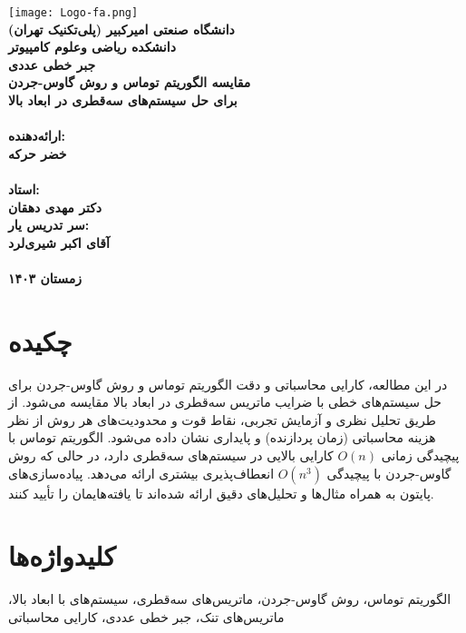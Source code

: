 \documentclass[a4paper,12pt]{article}
\begin{document}
\begin{titlepage}
    \centering
    \texttt{[image: Logo-fa.png]} \\[1cm]
    \textbf{\Large{دانشگاه صنعتی امیرکبیر (پلی‌تکنیک تهران)}} \\[0.5cm]
    \textbf{\Large{دانشکده ریاضی وعلوم کامپیوتر}} \\[0.5cm]
    \textbf{\Large{جبر خطی عددی}} \\[0.5cm]
    \textbf{\huge{مقایسه الگوریتم توماس و روش گاوس-جردن}} \\[0.5cm]
    \textbf{\huge{برای حل سیستم‌های سه‌قطری در ابعاد بالا}} \\[0.5cm]
    \textbf{\Large{}} \\[0.8cm]
    \textbf{\Large{ارائه‌دهنده:}} \\[0.2cm]
    \textbf{\large{خضر حرکه}} \\[1cm]
    \textbf{\Large{}} \\[0.2cm]
    \textbf{\large{استاد:}} \\[0.2cm]
    \textbf{\large{دکتر مهدی دهقان}} \\[1cm]
    \textbf{\Large{سر تدریس یار:}} \\[0.2cm]
    \textbf{\large{آقای اکبر شیری‌لرد}} \\[1cm] 
    \textbf{\Large{}} \\[0.2cm]
    \textbf{\large{زمستان ۱۴۰۳}}
\end{titlepage}

\newpage
{}
\setcounter{page}{1}

\section*{چکیده}
در این مطالعه، کارایی محاسباتی و دقت الگوریتم توماس و روش گاوس-جردن برای حل سیستم‌های خطی با ضرایب ماتریس سه‌قطری در ابعاد بالا مقایسه می‌شود. از طریق تحلیل نظری و آزمایش تجربی، نقاط قوت و محدودیت‌های هر روش از نظر هزینه محاسباتی (زمان پردازنده) و پایداری نشان داده می‌شود. الگوریتم توماس با پیچیدگی زمانی \(O(n)\) کارایی بالایی در سیستم‌های سه‌قطری دارد، در حالی که روش گاوس-جردن با پیچیدگی \(O(n^3)\) انعطاف‌پذیری بیشتری ارائه می‌دهد. پیاده‌سازی‌های پایتون به همراه مثال‌ها و تحلیل‌های دقیق ارائه شده‌اند تا یافته‌هایمان را تأیید کنند.

\section*{کلیدواژه‌ها}
الگوریتم توماس، روش گاوس-جردن، ماتریس‌های سه‌قطری، سیستم‌های با ابعاد بالا، ماتریس‌های تنک، جبر خطی عددی، کارایی محاسباتی
\end{document}
